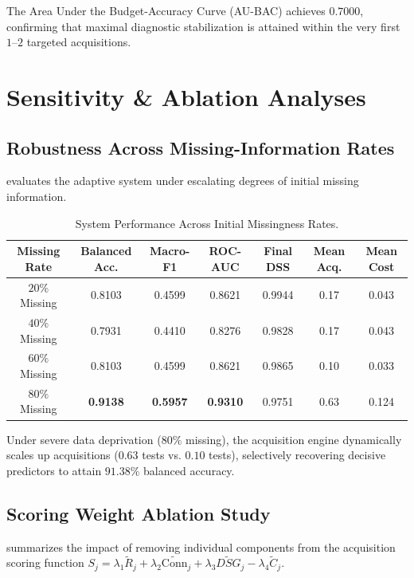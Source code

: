 \documentclass[11pt,a4paper]{report}
\begin{document}
The Area Under the Budget-Accuracy Curve (AU-BAC) achieves $0.7000$, confirming that maximal diagnostic stabilization is attained within the very first $1\text{--}2$ targeted acquisitions.

\section{Sensitivity \& Ablation Analyses}

\subsection{Robustness Across Missing-Information Rates}
 evaluates the adaptive system under escalating degrees of initial missing information.

\begin{table}[htbp]
  \centering
  \small
  \caption{System Performance Across Initial Missingness Rates.}
  \label{tab:robustness_missingness}
  \begin{tabular}{ccccccc}
    \toprule
    \textbf{Missing Rate} & \textbf{Balanced Acc.} & \textbf{Macro-F1} & \textbf{ROC-AUC} & \textbf{Final DSS} & \textbf{Mean Acq.} & \textbf{Mean Cost} \\
    \midrule
    $20\%$ Missing & 0.8103 & 0.4599 & 0.8621 & 0.9944 & 0.17 & 0.043 \\
    $40\%$ Missing & 0.7931 & 0.4410 & 0.8276 & 0.9828 & 0.17 & 0.043 \\
    $60\%$ Missing & 0.8103 & 0.4599 & 0.8621 & 0.9865 & 0.10 & 0.033 \\
    $80\%$ Missing & \textbf{0.9138} & \textbf{0.5957} & \textbf{0.9310} & 0.9751 & 0.63 & 0.124 \\
    \bottomrule
  \end{tabular}
\end{table}

Under severe data deprivation ($80\%$ missing), the acquisition engine dynamically scales up acquisitions ($0.63$ tests vs. $0.10$ tests), selectively recovering decisive predictors to attain $91.38\%$ balanced accuracy.

\subsection{Scoring Weight Ablation Study}
 summarizes the impact of removing individual components from the acquisition scoring function $S_j = \lambda_1 \widetilde{R}_j + \lambda_2 \widetilde{\text{Conn}}_j + \lambda_3 \widetilde{DSG}_j - \lambda_4 \widetilde{C}_j$.
\end{document}
